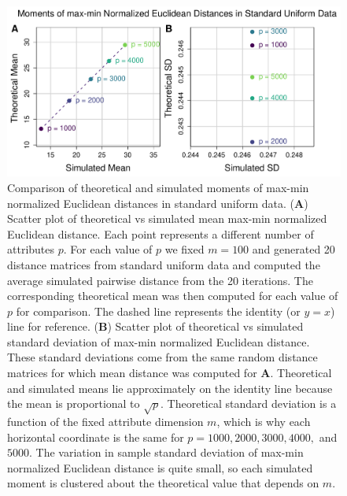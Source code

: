 \documentclass[10pt,letterpaper]{article}\usepackage[]{graphicx}\usepackage[]{color}
\begin{document}
\begin{figure}[H]
	\includegraphics[width=\textwidth]{compared_moments_uniform_euclidean_max-min.pdf}
	\caption{Comparison of theoretical and simulated moments of max-min normalized Euclidean distances in standard uniform data. (\textbf{A}) Scatter plot of theoretical vs simulated mean max-min normalized Euclidean distance. Each point represents a different number of attributes $p$. For each value of $p$ we fixed $m=100$ and generated 20 distance matrices from standard uniform data and computed the average simulated pairwise distance from the 20 iterations. The corresponding theoretical mean was then computed for each value of $p$ for comparison. The dashed line represents the identity (or $y=x$) line for reference. (\textbf{B}) Scatter plot of theoretical vs simulated standard deviation of max-min normalized Euclidean distance. These standard deviations come from the same random distance matrices for which mean distance was computed for \textbf{A}. Theoretical and simulated means lie approximately on the identity line because the mean is proportional to $\sqrt{p}$. Theoretical standard deviation is a function of the fixed attribute dimension $m$, which is why each horizontal coordinate is the same for $p=1000,2000,3000,4000,$ and $5000$. The variation in sample standard deviation of max-min normalized Euclidean distance is quite small, so each simulated moment is clustered about the theoretical value that depends on $m$.}
\end{figure}
\end{document}
